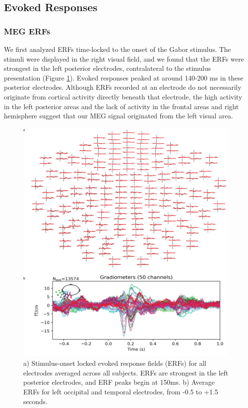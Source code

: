 \documentclass[../main.tex]{subfiles}
\begin{document}
\subsection{Evoked Responses}
\subsubsection{MEG ERFs}
We first analyzed ERFs time-locked to the onset of the Gabor stimulus. The stimuli were displayed in the right visual field, and we found that the ERFs were strongest in the left posterior electrodes, contralateral to the stimulus presentation (Figure \ref{erfs}). Evoked responses peaked at around 140-200 ms in these posterior electrodes. Although ERFs recorded at an electrode do not necessarily originate from cortical activity directly beneath that electrode, the high activity in the left posterior areas and the lack of activity in the frontal areas and right hemisphere suggest that our MEG signal originated from the left visual area.

\begin{figure}
    \centering
    \includegraphics[scale=0.7]{figures/results/erf_results.png}
    \caption{a) Stimulus-onset locked evoked response fields (ERFs) for all electrodes averaged across all subjects. ERFs are strongest in the left posterior electrodes, and ERF peaks begin at 150ms. b) Average ERFs for left occipital and temporal electrodes, from -0.5 to +1.5 seconds.}
    \label{erfs}
\end{figure}
\end{document}
